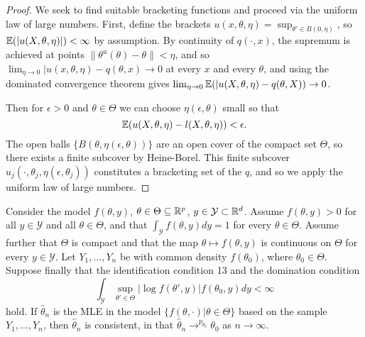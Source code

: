 \begin{proof}
  We seek to find suitable bracketing functions and proceed via the
  uniform law of large numbers. First, define the brackets $u(x,
  \theta, \eta) = \sup_{\theta' \in B(0, \eta)}$, so $\E{|u(X, \theta,
    \eta)|} < \infty$ by assumption. By continuity of $q(\cdot, x)$,
  the supremum is achieved at points $\| \theta^{u}(\theta) - \theta
  \| < \eta$, and so $\lim_{\eta \rightarrow 0} |u(x, \theta, \eta) -
  q(\theta, x) \rightarrow 0$ at every $x$ and every $\theta$, and
  using the dominated convergence theorem gives $\lim_{\eta
    \rightarrow 0}\E{|u(X, \theta, \eta) - q(\theta, X)} \rightarrow
  0$.

  Then for $\epsilon > 0$ and $\theta \in \Theta$ we can choose
  $\eta(\epsilon, \theta)$ small so that
  \begin{equation}
    \E{u(X, \theta, \eta) - l(X, \theta, \eta)} < \epsilon.
  \end{equation}
  The open balls $\{ B(\theta, \eta(\epsilon, \theta)) \} $ are an
  open cover of the compact set $\Theta$, so there exists a finite
  subcover by Heine-Borel. This finite subcover $u_{j}(\cdot,
  \theta_{j}, \eta(\epsilon, \theta_{j}))$ constitutes a bracketing
  set of the $q$, and so we apply the uniform law of large numbers.
\end{proof}

\begin{thm}
  Consider the model $f(\theta, y)$, $\theta \in \Theta \subseteq
  \mathbb{R}^{p}$, $y \in \mathcal{Y} \subset \mathbb{R}^{d}$.  Assume $f(\theta, y) >
  0$ for all $y \in \mathcal{Y}$ and all $\theta \in \Theta$, and that
  $\int_{\mathcal{Y}} f(\theta, y) dy = 1$ for every $\theta \in
  \Theta$. Assume further that $\Theta$ is compact and that the map
  $\theta \mapsto f(\theta, y)$ is continuous on $\Theta$ for every $y
  \in \mathcal{Y}$.  Let $Y_{1}, \dots, Y_{n}$ be \iid with common
  density $f(\theta_{0})$, where $\theta_{0} \in \Theta$.  Suppose
  finally that the identification condition 13 and the domination
  condition
  \begin{equation}
    \label{eq:2}
    \int_{\mathcal{Y}} \sup_{\theta' \in \Theta} | \log f(\theta', y)
    | f(\theta_{0}, y) dy < \infty
  \end{equation} hold.  If $\hat \theta_{n}$ is the MLE in the model
  $\{ f(\theta, \cdot) | \theta \in \Theta \} $ based on the sample
  $Y_{1}, \dots, Y_{n}$, then $\hat \theta_{n}$ is consistent, in that
  $\hat \theta_{n} \rightarrow^{p_{\theta_{0}}} \theta_{0}$ as $n
  \rightarrow \infty$.
\end{thm}

